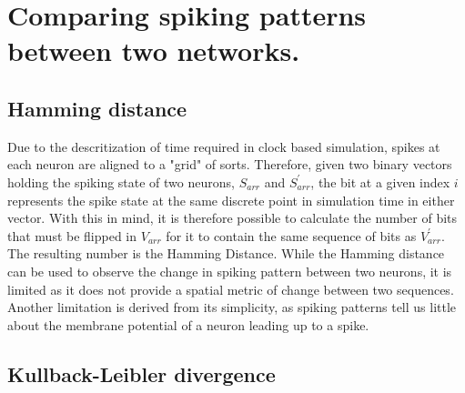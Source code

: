 

\section{Comparing spiking patterns between two networks.}
\label{Comparingspikingpatternsbetweentwonetworks}

\subsection{Hamming distance}
Due to the descritization of time required in clock based simulation, spikes at
each neuron are aligned to a "grid" of sorts. Therefore, given two binary
vectors holding the spiking state of two neurons, $S_{arr}$ and $S^\prime_{arr}$, the bit at a given index $i$ represents
the spike state at the same discrete point in simulation time in either vector.
With this in mind, it is therefore possible to calculate the number of bits
that must be flipped in $V_{arr}$ for it to contain the same sequence of bits as
$V^\prime_{arr}$. The resulting number is the Hamming Distance. While the
Hamming distance can be used to observe the change in spiking pattern between
two neurons, it is limited as it does not provide a spatial metric of change
between two sequences. Another limitation is derived from its simplicity, as
spiking patterns tell us little about the membrane potential of a neuron leading
up to a spike.

\subsection{Kullback-Leibler divergence}

